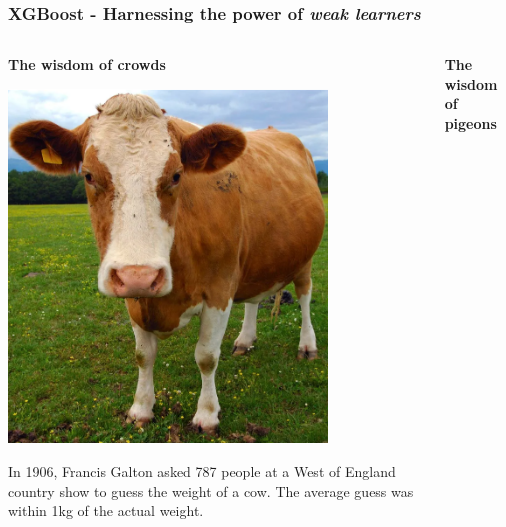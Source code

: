 \begin{frame}
\frametitle{XGBoost - Harnessing the power of \textit{weak learners}}
\pause
\begin{columns}[T]
    \begin{column}{0.5\textwidth}
    \begin{center}
        \textbf{The wisdom of crowds}\\
        \vspace{2mm}
        
        \includegraphics[width=0.77\textwidth]{./images/cow}
        
        \footnotesize{In 1906, Francis Galton asked 787 people at a West of England country show to guess the weight of a cow. The average guess was within 1kg of the actual weight.}
        
    \end{center}
        
    \end{column}
\pause

    \begin{column}{0.48\textwidth}
    \begin{center}
    \textbf{The wisdom of pigeons}\\
    \vspace{2mm}
        

\end{center}
\end{column}
\end{columns}
\end{frame}
